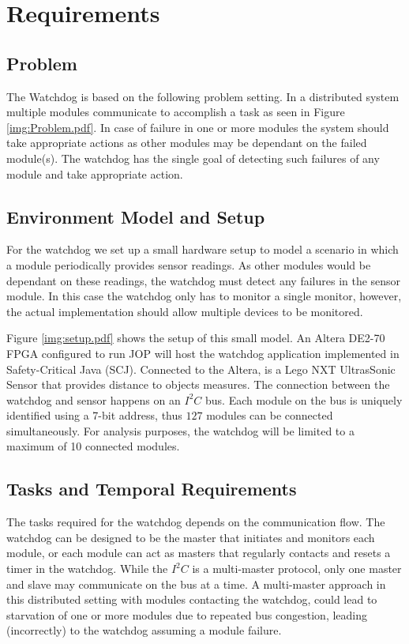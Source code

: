 \chapter{Requirements}
\section{Problem}
The Watchdog is based on the following problem setting. In a distributed system multiple modules communicate to accomplish a task as seen in Figure \ref{img:Problem.pdf}. In case of failure in one or more modules the system should take appropriate actions as other modules may be dependant on the failed module(s). The watchdog has the single goal of detecting such failures of any module and take appropriate action.

\section{Environment Model and Setup}
For the watchdog we set up a small hardware setup to model a scenario in which a module periodically provides sensor readings. As other modules would be dependant on these readings, the watchdog must detect any failures in the sensor module. In this case the watchdog only has to monitor a single monitor, however, the actual implementation should allow multiple devices to be monitored.

Figure \ref{img:setup.pdf} shows the setup of this small model. An Altera DE2-70 FPGA configured to run JOP will host the watchdog application implemented in Safety-Critical Java (SCJ). Connected to the Altera, is a Lego NXT UltrasSonic Sensor that provides distance to objects measures. The connection between the watchdog and sensor happens on an $\textit{I}^2\textit{C}$ bus. Each module on the bus is uniquely identified using a 7-bit address, thus $127$ modules can be connected simultaneously. For analysis purposes, the watchdog will be limited to a maximum of 10 connected modules.

\section{Tasks and Temporal Requirements}
The tasks required for the watchdog depends on the communication flow. The watchdog can be designed to be the master that initiates and monitors each module, or each module can act as masters that regularly contacts and resets a timer in the watchdog. While the $\textit{I}^2\textit{C}$ is a multi-master protocol, only one master and slave may communicate on the bus at a time. A multi-master approach in this distributed setting with modules contacting the watchdog, could lead to starvation of one or more modules due to repeated bus congestion, leading (incorrectly) to the watchdog assuming a module failure.

